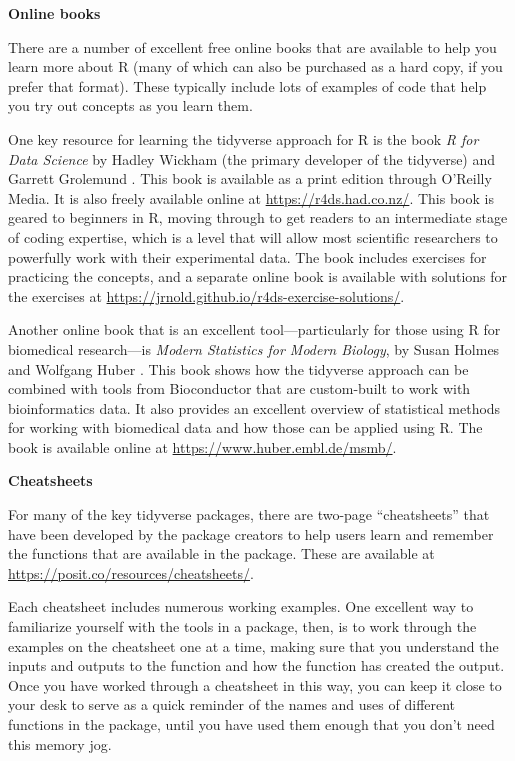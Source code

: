 \documentclass[]{tufte-book}
\begin{document}
\textbf{Online books}

There are a number of excellent free online books that are available to help
you learn more about R (many of which can also be purchased as a hard copy, if
you prefer that format). These typically include lots of examples of code that
help you try out concepts as you learn them.

One key resource for learning the tidyverse approach for R is the book \emph{R for
Data Science} by Hadley Wickham (the primary developer of the tidyverse) and
Garrett Grolemund \citep{wickham2016r}. This book is available as a print edition
through O'Reilly Media. It is also freely available online at
\url{https://r4ds.had.co.nz/}. This book is geared to beginners in R, moving through
to get readers to an intermediate stage of coding expertise, which is a level
that will allow most scientific researchers to powerfully work with their
experimental data. The book includes exercises for practicing the concepts, and
a separate online book is available with solutions for the exercises
at \url{https://jrnold.github.io/r4ds-exercise-solutions/}.

Another online book that is an excellent tool---particularly for those using R
for biomedical research---is \emph{Modern Statistics for Modern Biology}, by Susan
Holmes and Wolfgang Huber \citep{holmes2018modern}. This book shows how the tidyverse
approach can be combined with tools from Bioconductor that are custom-built to
work with bioinformatics data. It also provides an excellent overview of
statistical methods for working with biomedical data and how those can be
applied using R. The book is available online at
\url{https://www.huber.embl.de/msmb/}.

\textbf{Cheatsheets}

For many of the key tidyverse packages, there are two-page ``cheatsheets'' that
have been developed by the package creators to help users learn and remember
the functions that are available in the package. These are available at
\url{https://posit.co/resources/cheatsheets/}.

Each cheatsheet includes numerous working examples. One excellent way to
familiarize yourself with the tools in a package, then, is to work through the
examples on the cheatsheet one at a time, making sure that you understand the
inputs and outputs to the function and how the function has created the output.
Once you have worked through a cheatsheet in this way, you can keep it close
to your desk to serve as a quick reminder of the names and uses of different
functions in the package, until you have used them enough that you don't need
this memory jog.
\end{document}
